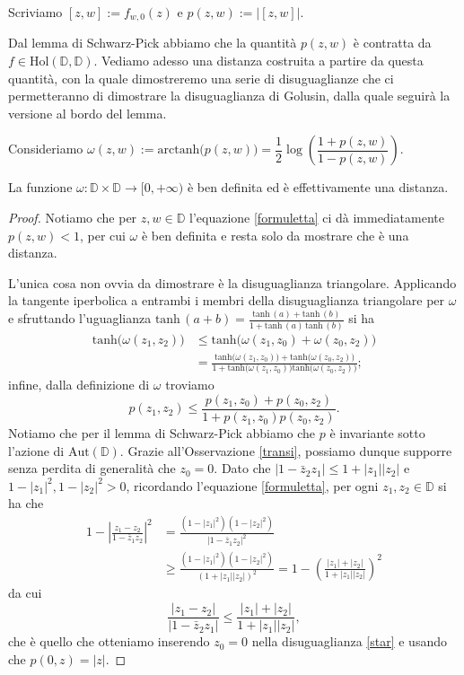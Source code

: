 \begin{defn}
  Scriviamo $[z,w]:=f_{w,0}(z)$ e $p(z,w):=|[z,w]|$.
\end{defn}

Dal lemma di Schwarz-Pick abbiamo che la quantità $p(z,w)$ è contratta da $f \in \text{Hol}(\mathbb{D}, \mathbb{D})$. Vediamo adesso una distanza costruita a partire da questa quantità, con la quale dimostreremo una serie di disuguaglianze che ci permetteranno di dimostrare la disuguaglianza di Golusin, dalla quale seguirà la versione al bordo del lemma.

 Consideriamo $\omega(z,w):=\text{arctanh}\bigl(p(z,w)\bigr)=\dfrac{1}{2}\log\left(\dfrac{1+p(z,w)}{1-p(z,w)}\right)$.

\begin{prop}
  La funzione $\omega: \mathbb{D}\times \mathbb{D} \longrightarrow [0,+\infty)$ è ben definita ed è effettivamente una distanza.
\end{prop}

\begin{proof}
  Notiamo che per $z,w \in \mathbb{D}$ l'equazione \eqref{formuletta} ci dà immediatamente $p(z,w)<1$, per cui $\omega$ è ben definita e resta solo da mostrare che è una distanza.

  L'unica cosa non ovvia da dimostrare è la disuguaglianza triangolare. Applicando la tangente iperbolica a entrambi i membri della disuguaglianza triangolare per $\omega$ e sfruttando l'uguaglianza $\text{tanh}\,(a+b)=\frac{\text{tanh}\,(a)+\text{tanh}\,(b)}{1+\text{tanh}\,(a)\,\text{tanh}\,(b)}$ si ha
  \begin{align*}
    \text{tanh}\bigl(\omega(z_1,z_2)\bigr) & \le \text{tanh}\bigl(\omega(z_1, z_0)+\omega(z_0,z_2)\bigr) \\
    &=\frac{\text{tanh}\bigl(\omega(z_1, z_0)\bigr)+\text{tanh}\bigl(\omega(z_0,z_2)\bigr)}{1+\text{tanh}\bigl(\omega(z_1, z_0)\bigr)\text{tanh}\bigl(\omega(z_0,z_2)\bigr)};
  \end{align*}
  infine, dalla definizione di $\omega$ troviamo
  \begin{equation}
    p(z_1,z_2) \le \frac{p(z_1,z_0)+p(z_0,z_2)}{1+p(z_1,z_0)p(z_0,z_2)}. \label{star}
  \end{equation}
  Notiamo che per il lemma di Schwarz-Pick abbiamo che $p$ è invariante sotto l'azione di $\text{Aut}(\mathbb{D})$. Grazie all'Osservazione \ref{transi}, possiamo dunque supporre senza perdita di generalità che $z_0=0$. Dato che $|1-\bar{z}_2z_1| \le 1+|z_1||z_2|$ e $1-|z_1|^2, 1-|z_2|^2>0$, ricordando l'equazione \eqref{formuletta}, per ogni $z_1, z_2 \in \mathbb{D}$ si ha che
  \begin{align*}
    1-\left|\frac{z_1-z_2}{1-\bar{z}_1z_2}\right|^2 & =\frac{(1-|z_1|^2)(1-|z_2|^2)}{|1-\bar{z}_1z_2|^2} \\
    & \ge \frac{(1-|z_1|^2)(1-|z_2|^2)}{(1+|z_1||z_2|)^2}=1-\left(\frac{|z_1|+|z_2|}{1+|z_1||z_2|}\right)^2
  \end{align*}
  da cui
  $$\frac{|z_1-z_2|}{|1-\bar{z}_2z_1|} \le \frac{|z_1|+|z_2|}{1+|z_1||z_2|},$$
  che è quello che otteniamo inserendo $z_0=0$ nella disuguaglianza \eqref{star} e usando che $p(0,z)=|z|$.
\end{proof}

